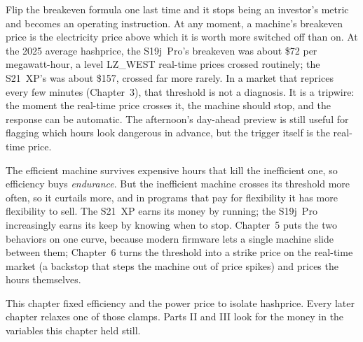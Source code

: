 Flip the breakeven formula one last time and it stops being an investor's metric and becomes an operating instruction. At any moment, a machine's breakeven price is the electricity price above which it is worth more switched off than on. At the 2025 average hashprice, the S19j~Pro's breakeven was about \$72 per megawatt-hour, a level LZ\_WEST real-time prices crossed routinely; the S21~XP's was about \$157, crossed far more rarely. %
In a market that reprices every few minutes (Chapter~3), that threshold is not a diagnosis. It is a tripwire: the moment the real-time price crosses it, the machine should stop, and the response can be automatic. The afternoon's day-ahead preview is still useful for flagging which hours look dangerous in advance, but the trigger itself is the real-time price. %

The efficient machine survives expensive hours that kill the inefficient one, so efficiency buys \emph{endurance}. But the inefficient machine crosses its threshold more often, so it curtails more, and in programs that pay for flexibility it has more flexibility to sell. The S21~XP earns its money by running; the S19j~Pro increasingly earns its keep by knowing when to stop. Chapter~5 puts the two behaviors on one curve, because modern firmware lets a single machine slide between them; Chapter~6 turns the threshold into a strike price on the real-time market (a backstop that steps the machine out of price spikes) and prices the hours themselves. %

This chapter fixed efficiency and the power price to isolate hashprice. Every later chapter relaxes one of those clamps. Parts II and III look for the money in the variables this chapter held still.
